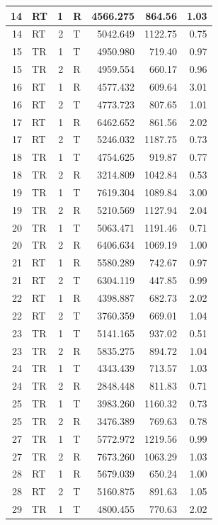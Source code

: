 \documentclass[12pt,]{krantz}
\begin{document}
\begin{table}
\begin{tabular}[t]{r|l|r|l|r|r|r}
\hline
14 & RT & 1 & R & 4566.275 & 864.56 & 1.03\\
\hline
14 & RT & 2 & T & 5042.649 & 1122.75 & 0.75\\
\hline
15 & TR & 1 & T & 4950.980 & 719.40 & 0.97\\
\hline
15 & TR & 2 & R & 4959.554 & 660.17 & 0.96\\
\hline
16 & RT & 1 & R & 4577.432 & 609.64 & 3.01\\
\hline
16 & RT & 2 & T & 4773.723 & 807.65 & 1.01\\
\hline
17 & RT & 1 & R & 6462.652 & 861.56 & 2.02\\
\hline
17 & RT & 2 & T & 5246.032 & 1187.75 & 0.73\\
\hline
18 & TR & 1 & T & 4754.625 & 919.87 & 0.77\\
\hline
18 & TR & 2 & R & 3214.809 & 1042.84 & 0.53\\
\hline
19 & TR & 1 & T & 7619.304 & 1089.84 & 3.00\\
\hline
19 & TR & 2 & R & 5210.569 & 1127.94 & 2.04\\
\hline
20 & TR & 1 & T & 5063.471 & 1191.46 & 0.71\\
\hline
20 & TR & 2 & R & 6406.634 & 1069.19 & 1.00\\
\hline
21 & RT & 1 & R & 5580.289 & 742.67 & 0.97\\
\hline
21 & RT & 2 & T & 6304.119 & 447.85 & 0.99\\
\hline
22 & RT & 1 & R & 4398.887 & 682.73 & 2.02\\
\hline
22 & RT & 2 & T & 3760.359 & 669.01 & 1.04\\
\hline
23 & TR & 1 & T & 5141.165 & 937.02 & 0.51\\
\hline
23 & TR & 2 & R & 5835.275 & 894.72 & 1.04\\
\hline
24 & TR & 1 & T & 4343.439 & 713.57 & 1.03\\
\hline
24 & TR & 2 & R & 2848.448 & 811.83 & 0.71\\
\hline
25 & TR & 1 & T & 3983.260 & 1160.32 & 0.73\\
\hline
25 & TR & 2 & R & 3476.389 & 769.63 & 0.78\\
\hline
27 & TR & 1 & T & 5772.972 & 1219.56 & 0.99\\
\hline
27 & TR & 2 & R & 7673.260 & 1063.29 & 1.03\\
\hline
28 & RT & 1 & R & 5679.039 & 650.24 & 1.00\\
\hline
28 & RT & 2 & T & 5160.875 & 891.63 & 1.05\\
\hline
29 & TR & 1 & T & 4800.455 & 770.63 & 2.02\\

\end{tabular}
\end{table}
\end{document}
